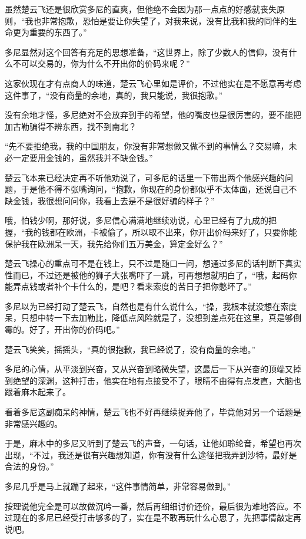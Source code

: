 虽然楚云飞还是很欣赏多尼的直爽，但他绝不会因为那一点点的好感就丧失原则，“我也非常抱歉，恐怕是要让你失望了，对我来说，没有比我和我的同伴的生命更为重要的东西了。”

多尼显然对这个回答有充足的思想准备，“这世界上，除了少数人的信仰，没有什么不可以交易的，你为什么不开出你的价码来呢？”

这家伙现在才有点商人的味道，楚云飞心里如是评价，不过他实在是不愿意再考虑这件事了，“没有商量的余地，真的，我只能说，我很抱歉。”

没有余地才怪，多尼绝对不会放弃到手的希望，他的嘴皮也是很厉害的，要不能把加古勒骗得不辨东西，找不到南北？

“先不要拒绝我，我的中国朋友，你没有非常想做又做不到的事情么？交易嘛，未必一定要用金钱的，虽然我并不缺金钱。”

楚云飞本来已经决定再不听他劝说了，可多尼的话里一下带出两个他感兴趣的问题，于是他不得不张嘴询问，“抱歉，你现在的身份都似乎不太体面，还说自己不缺金钱，我很想问问你，我看上去是不是很好骗的样子？”

哦，怕钱少啊，那好说，多尼信心满满地继续劝说，心里已经有了九成的把握，“我的钱都在欧洲，卡被偷了，所以取不出来，你开出价码来好了，只要你能保护我在欧洲呆一天，我先给你们五万美金，算定金好么？”

楚云飞操心的重点可不是在钱上，只不过是随口一问，想通过多尼的话判断下真实性而已，不过还是被他的狮子大张嘴吓了一跳，可再想想就明白了，“哦，起码你能弄点钱或者补个卡什么的，是吧？看来索度的苦日子把你憋坏了。”

多尼以为已经打动了楚云飞，自然也是有什么说什么，“操，我根本就没想在索度呆，只想中转一下去加勒比，降低点风险就是了，没想到差点死在这里，真是够倒霉的。好了，开出你的价码吧。”

楚云飞笑笑，摇摇头，“真的很抱歉，我已经说了，没有商量的余地。”

多尼的心情，从平淡到兴奋，又从兴奋到略微失望，这最后一下从兴奋的顶端又掉到绝望的深渊，这种打击，他实在地有点接受不了，眼睛不由得有点发直，大脑也跟着麻木起来了。

看着多尼这副痴呆的神情，楚云飞也不好再继续捉弄他了，毕竟他对另一个话题是非常感兴趣的。

于是，麻木中的多尼又听到了楚云飞的声音，一句话，让他如聆纶音，希望也再次出现，“不过，我还是很有兴趣想知道，你有没有什么途径把我弄到沙特，最好是合法的身份。”

多尼几乎是马上就蹦了起来，“这件事情简单，非常容易做到。”

按理说他完全是可以故做沉吟一番，然后再细细讨价还价，最后很为难地答应。不过现在的多尼已经受打击够多的了，实在是不敢再玩什么心思了，先把事情敲定再说吧。

